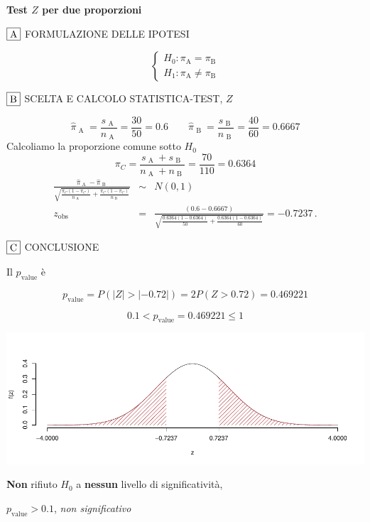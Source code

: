 \documentclass[
  11pt,
]{book}
\theoremstyle{mytheoremstyle}
\theoremstyle{mydefstyle}
\newenvironment{sol}
  {
  \begin{tcolorbox}[enhanced,breakable,arc=0.1mm,boxrule=1pt,colback=white,colframe=iblue,
  title=\bf \fontfamily{lmss}\selectfont \hspace{.5 cm} Soluzione,drop fuzzy shadow]

}{
\end{tcolorbox}
  }
\begin{document}
\begin{sol}
\textbf{Test \(Z\) per due proporzioni}

\(\fbox{A}\) FORMULAZIONE DELLE IPOTESI

\[\begin{cases}
   H_0: \pi_\text{A} = \pi_\text{B} \\
   H_1: \pi_\text{A} \neq \pi_\text{B} 
   \end{cases}\]

\(\fbox{B}\) SCELTA E CALCOLO STATISTICA-TEST, \(Z\)

\[\hat\pi_\text{ A }=\frac{s_\text{ A }}{n_\text{ A }}=\frac{ 30 }{ 50 }= 0.6 \qquad
   \hat\pi_\text{ B }=\frac{s_\text{ B }}{n_\text{ B }}=\frac{ 40 }{ 60 }= 0.6667 \]Calcoliamo la proporzione comune sotto \(H_0\)
\[
     \pi_C=\frac{s_\text{ A }+s_\text{ B }}{n_\text{ A }+n_\text{ B }}=
     \frac{ 70 }{ 110 }= 0.6364 
   \]\begin{eqnarray*}
   \frac{\hat\pi_\text{ A } - \hat\pi_\text{ B }}
   {\sqrt{\frac {\pi_C(1-\pi_C)}{n_\text{ A }}+\frac {\pi_C(1-\pi_C)}{n_\text{ B }}}}&\sim&N(0,1)\\
   z_{\text{obs}}
   &=& \frac{ ( 0.6 -  0.6667 )} {\sqrt{\frac{ 0.6364 (1- 0.6364 )}{ 50 }+\frac{ 0.6364 (1- 0.6364 )}{ 60 }}}
   =   -0.7237 \, .
   \end{eqnarray*}

\(\fbox{C}\) CONCLUSIONE

Il \(p_{\text{value}}\) è

\[ p_{\text{value}} = P(|Z|>|-0.72|)=2P(Z>0.72)=0.469221 \]

\[
 0.1 < p_\text{value}= 0.469221 \leq 1 
\]

\begin{center}\includegraphics{Esami_passati_con_soluzioni_files/figure-latex/2021-4,-1} \end{center}

\textbf{Non} rifiuto \(H_0\) a \textbf{nessun}
livello di significatività,

\(p_\text{value}>0.1\),
\emph{non significativo}

\end{sol}
\end{document}
